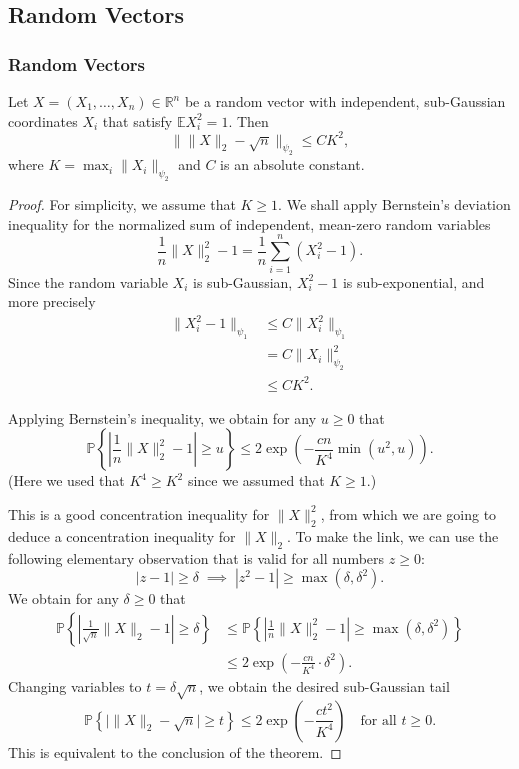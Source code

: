 \subsection{Random Vectors}

\subsubsection{Random Vectors}
\begin{thm}
\label{thm:concentration-norm}
Let $X = (X_1, \ldots, X_n) \in \mathbb{R}^n$ be a random vector with independent, sub-Gaussian coordinates $X_i$ that satisfy $\mathbb{E} X_i^2 = 1$. Then
\[
\big\| \|X\|_2 - \sqrt{n} \big\|_{\psi_2} \leq C K^2,
\]
where $K = \max_i \|X_i\|_{\psi_2}$ and $C$ is an absolute constant.
\end{thm}

\begin{proof}
For simplicity, we assume that $K \geq 1$. We shall apply Bernstein's deviation inequality for the normalized sum of independent, mean-zero random variables
\[
\frac{1}{n} \|X\|_2^2 - 1 = \frac{1}{n} \sum_{i=1}^n (X_i^2 - 1).
\]
Since the random variable $X_i$ is sub-Gaussian, $X_i^2 - 1$ is sub-exponential, and more precisely
\begin{align*}
\|X_i^2 - 1\|_{\psi_1} 
&\leq C \|X_i^2\|_{\psi_1}  \\
&= C \|X_i\|_{\psi_2}^2 \\
&\leq C K^2.
\end{align*}

Applying Bernstein's inequality, we obtain for any $u \geq 0$ that
\[
\mathbb{P}\!\left\{ \left| \frac{1}{n} \|X\|_2^2 - 1 \right| \geq u \right\} \leq 2 \exp\!\left( -\frac{c n}{K^4} \min(u^2, u) \right). \tag{3.1}
\]
(Here we used that $K^4 \geq K^2$ since we assumed that $K \geq 1$.)

This is a good concentration inequality for $\|X\|_2^2$, from which we are going to deduce a concentration inequality for $\|X\|_2$. To make the link, we can use the following elementary observation that is valid for all numbers $z \geq 0$:
\[
|z - 1| \geq \delta \;\implies\; |z^2 - 1| \geq \max(\delta, \delta^2). \tag{3.2}
\]
We obtain for any $\delta \geq 0$ that
\begin{align*}
\mathbb{P}\!\left\{ \left| \tfrac{1}{\sqrt{n}} \|X\|_2 - 1 \right| \geq \delta \right\} 
&\leq \mathbb{P}\!\left\{ \left| \tfrac{1}{n} \|X\|_2^2 - 1 \right| \geq \max(\delta, \delta^2) \right\} \\
&\leq 2 \exp\!\left( -\frac{c n}{K^4} \cdot \delta^2 \right) .
\end{align*}
Changing variables to $t = \delta \sqrt{n}$, we obtain the desired sub-Gaussian tail
\[
\mathbb{P}\!\left\{ \big| \|X\|_2 - \sqrt{n} \big| \geq t \right\} \leq 2 \exp\!\left( -\frac{c t^2}{K^4} \right) \quad \text{for all } t \geq 0. \tag{3.3}
\]
This is equivalent to the conclusion of the theorem. \qedhere
\end{proof}

